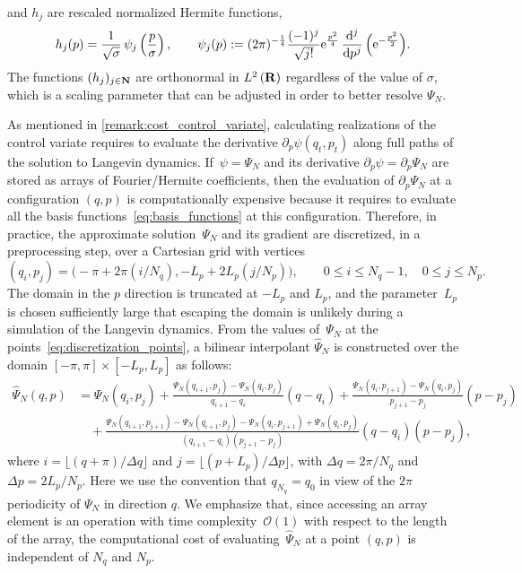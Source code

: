 \documentclass[11pt,a4paper]{article}
\begin{document}
and $h_j$ are rescaled normalized Hermite functions,
\begin{equation}
  \label{eq:definition_hermite_functions}
  h_j(p) = \frac{1}{\sqrt{\sigma}} \, \psi_j \left( \frac{p}{\sigma} \right),
  \qquad \psi_j (p) := (2 \pi)^{-\frac{1}{4}} \frac{(-1)^j}{\sqrt{j!}} \e^{\frac{p^2}{4}} \, \derivative*{j}{p^j} \, \Bigl( \e^{- \frac{p^2}{2}} \Bigr).
\end{equation}
The functions $(h_j)_{j\in \mathbf N}$ are orthonormal in $\lp{2}{\real}$ regardless of the value of $\sigma$,
which is a scaling parameter that can be adjusted in order to better resolve $\Psi_N$.

As mentioned in \cref{remark:cost_control_variate},
calculating realizations of the control variate requires to evaluate the derivative $\partial_p \psi(q_t, p_t)$ along full paths of the solution to Langevin dynamics.
If~$\psi = \Psi_N$ and its derivative $\partial_p \psi = \partial_p \Psi_N$ are stored as arrays of Fourier/Hermite coefficients,
then the evaluation of $\partial_p \Psi_N$ at a configuration $(q, p)$ is computationally expensive
because it requires to evaluate all the basis functions~\eqref{eq:basis_functions} at this configuration.
Therefore, in practice, the approximate solution~$\Psi_N$ and its gradient are discretized, in a preprocessing step,
over a Cartesian grid with vertices
\begin{equation}
    \label{eq:discretization_points}
    (q_i, p_j) = \bigl(- \pi + 2\pi(i/N_q) , - L_p + 2L_p (j/N_p) \bigr), \qquad 0 \leq i \leq N_q - 1, \quad 0 \leq j \leq N_p.
\end{equation}
The domain in the $p$ direction is truncated at $-L_p$ and $L_p$,
and the parameter~$L_p$ is chosen sufficiently large that escaping the domain is unlikely during a simulation of the Langevin dynamics.
From the values of~$\Psi_N$ at the points~\eqref{eq:discretization_points},
a bilinear interpolant $\widehat \Psi_N$ is constructed over the domain $[-\pi, \pi] \times [-L_p, L_p]$ as follows:
\begin{align*}
    \widehat \Psi_N(q, p)
    &= \Psi_N(q_i,p_j) + \frac{\Psi_N(q_{i+1}, p_j) - \Psi_N(q_i, p_j)}{q_{i+1} - q_i} (q - q_i)
    +\frac{\Psi_N(q_{i}, p_{j+1}) - \Psi_N(q_{i}, p_{j})}{p_{j+1} - p_j} (p - p_j) \\
    &\quad + \frac{\Psi_N(q_{i+1}, p_{j+1}) - \Psi_N(q_{i+1}, p_{j}) - \Psi_N(q_{i}, p_{j+1}) + \Psi_N(q_{i}, p_{j})}{(q_{i+1} - q_i)(p_{j+1} - p_j)}  (q-q_i)(p-p_j),
\end{align*}
where $i = \lfloor (q + \pi) / \Delta q \rfloor$ and $j = \lfloor (p+L_p) / \Delta p \rfloor$,
with $\Delta q = 2\pi/N_q$ and $\Delta p = 2L_p/N_p$.
Here we use the convention that $q_{N_q} = q_{0}$ in view of the $2\pi$ periodicity of $\Psi_N$ in direction $q$.
We emphasize that,
since accessing an array element is an operation with time complexity~$\mathcal O(1)$ with respect to the length of the array,
the computational cost of evaluating~$\widehat \Psi_N$ at a point $(q,p)$ is independent of $N_q$ and $N_p$.
\end{document}
